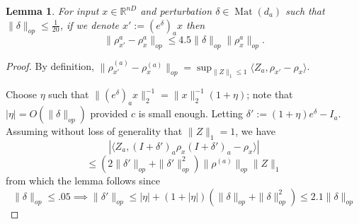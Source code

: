 \documentclass[aos]{imsart}
\newtheorem{lemma}[theorem]{Lemma}
\theoremstyle{definition}
\numberwithin{equation}{section}
\DeclareMathOperator{\Mat}{Mat}
\newcommand{\R}{{\mathbb{R}}}
\newcommand{\samp}{x}
\begin{document}
\begin{appendix}

\begin{lemma} \label{atoaaRobustness}
For input $\samp \in \R^{nD}$ and perturbation $\delta \in \Mat(d_{a})$ such that $\|\delta\|_{op} \leq \frac{1}{20}$, if we denote $\samp' := (e^{\delta})_{a} \samp$ then
\[ \|\rho_{\samp'}^{a} - \rho_{\samp}^{a}\|_{op} \leq 4.5 \|\delta\|_{op} \|\rho_{\samp}^{a}\|_{op}   . \]
\end{lemma}
\begin{proof} By definition, $\|\rho_{\samp'}^{(a)} - \rho_{\samp}^{(a)}\|_{op} = \sup_{\|Z\|_{1} \leq 1} \langle Z_{a}, \rho_{\samp'} - \rho_{\samp} \rangle $.


Choose $\eta$ such that  $\|(e^{\delta})_{a} \samp\|_{2}^{-1} = \|\samp\|_{2}^{-1} (1 + \eta)$; note that $|\eta| = O(\|\delta\|_{op})$ provided $c$ is small enough. Letting $\delta' := (1+\eta)e^{\delta} - I_{a}$. Assuming without loss of generality that $\|Z\|_{1} = 1$, we have
\[ | \langle Z_{a}, (I+\delta')_a \rho_{\samp} (I+\delta')_a - \rho_{\samp} \rangle | \]
\[ \leq (2\|\delta'\|_{op} + \|\delta'\|_{op}^{2}) \|\rho^{(a)}\|_{op} \|Z\|_{1}    \]
from which the lemma follows since
\[ \|\delta\|_{op} \leq .05 \implies \|\delta'\|_{op} \leq |\eta| + (1+|\eta|)(\|\delta\|_{op} + \|\delta\|_{op}^{2}) \leq  2.1 \|\delta\|_{op} \]
\end{proof}


\end{appendix}
\end{document}
